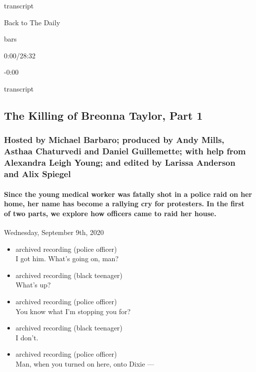 transcript

Back to The Daily

bars

0:00/28:32

-0:00

transcript

\hypertarget{the-killing-of-breonna-taylor-part-1-2}{%
\subsection{The Killing of Breonna Taylor, Part
1}\label{the-killing-of-breonna-taylor-part-1-2}}

\hypertarget{hosted-by-michael-barbaro-produced-by-andy-mills-asthaa-chaturvedi-and-daniel-guillemette-with-help-from-alexandra-leigh-young-and-edited-by-larissa-anderson-and-alix-spiegel-1}{%
\subsubsection{Hosted by Michael Barbaro; produced by Andy Mills, Asthaa
Chaturvedi and Daniel Guillemette; with help from Alexandra Leigh Young;
and edited by Larissa Anderson and Alix
Spiegel}\label{hosted-by-michael-barbaro-produced-by-andy-mills-asthaa-chaturvedi-and-daniel-guillemette-with-help-from-alexandra-leigh-young-and-edited-by-larissa-anderson-and-alix-spiegel-1}}

\hypertarget{since-the-young-medical-worker-was-fatally-shot-in-a-police-raid-on-her-home-her-name-has-become-a-rallying-cry-for-protesters-in-the-first-of-two-parts-we-explore-how-officers-came-to-raid-her-house-2}{%
\paragraph{Since the young medical worker was fatally shot in a police
raid on her home, her name has become a rallying cry for protesters. In
the first of two parts, we explore how officers came to raid her
house.}\label{since-the-young-medical-worker-was-fatally-shot-in-a-police-raid-on-her-home-her-name-has-become-a-rallying-cry-for-protesters-in-the-first-of-two-parts-we-explore-how-officers-came-to-raid-her-house-2}}

Wednesday, September 9th, 2020

\begin{itemize}
\item
  archived recording (police officer)\\
  I got him. What's going on, man?
\item
  archived recording (black teenager)\\
  What's up?
\item
  archived recording (police officer)\\
  You know what I'm stopping you for?
\item
  archived recording (black teenager)\\
  I don't.
\item
  archived recording (police officer)\\
  Man, when you turned on here, onto Dixie ---
\end{itemize}

